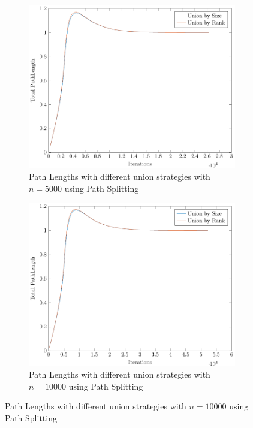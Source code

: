\begin{figure}[ht]
\begin{subfigure}{0.32\textwidth}
    \end{subfigure}%
    \hfill
    \begin{subfigure}{0.32\textwidth}
        \centering
        \includegraphics[width=\textwidth]{../images/plotPSNonFull5000_PathLength.pdf}
        \caption{Path Lengths with different union strategies with $n = 5000$ using Path Splitting}
    \end{subfigure}%
    \hfill
    \begin{subfigure}{0.32\textwidth}
        \centering
        \includegraphics[width=\textwidth]{../images/plotPSNonFull10000_PathLength.pdf}
        \caption{Path Lengths with different union strategies with $n = 10000$ using Path Splitting}
    \end{subfigure}


\end{figure}
